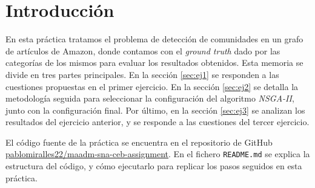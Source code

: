 \section{Introducción}

En esta práctica tratamos el problema de detección de comunidades en un grafo
de artículos de Amazon, donde contamos con el \emph{ground truth} dado por las
categorías de los mismos para evaluar los resultados obtenidos. Esta memoria
se divide en tres partes principales. En la sección \ref{sec:ej1} se responden
a las cuestiones propuestas en el primer ejercicio. En la sección \ref{sec:ej2}
se detalla la metodología seguida para seleccionar la configuración del algoritmo
\emph{NSGA-II}, junto con la configuración final. Por último, en la sección
\ref{sec:ej3} se analizan los resultados del ejercicio anterior, y se responde
a las cuestiones del tercer ejercicio.

El código fuente de la práctica se encuentra en el repositorio de GitHub
\href{https://github.com/pablomiralles22/maadm-sna-ceb-assignment}{pablomiralles22/maadm-sna-ceb-assignment}. En el fichero \lstinline{README.md} se explica la estructura del
código, y cómo ejecutarlo para replicar los pasos seguidos en esta práctica.

